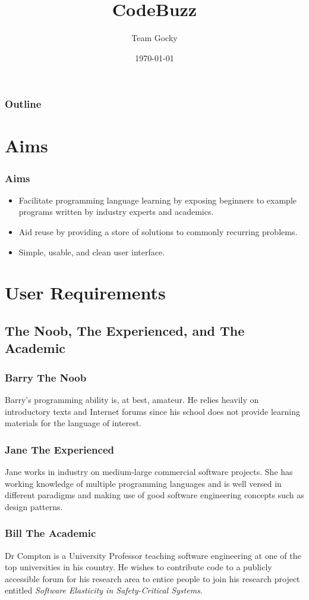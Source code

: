 \documentclass{beamer}
\title[DIM3 Project Presentation]{CodeBuzz}
\author{Team Gocky}
\institute{University Of Glasgow}
\date{\today}
\begin{document}
\begin{frame}
\titlepage
\end{frame}

\begin{frame}
\frametitle{Outline}
\tableofcontents
\end{frame}

\section{Aims}

\begin{frame}
\frametitle{Aims}
\begin{itemize}
\item Facilitate programming language learning by exposing beginners to
example programs written by industry experts and academics.
\item Aid reuse by providing a store of solutions to commonly recurring
problems.
\item Simple, usable, and clean user interface.
\end{itemize}
\end{frame}

\section{User Requirements}

\subsection{The Noob, The Experienced, and The Academic}

\begin{frame}
\frametitle{Barry The Noob}
Barry's programming ability is, at best,
amateur. He relies heavily on introductory texts and Internet forums
since his school does not provide learning materials for the language
of interest.
\end{frame}

\begin{frame}
\frametitle{Jane The Experienced}
Jane works in industry on medium-large commercial software projects. She has 
working knowledge of multiple programming languages and is well versed in 
different paradigms and making use of good software engineering concepts such as 
design patterns.
\end{frame}

\begin{frame}
\frametitle{Bill The Academic}
Dr Compton is a University Professor teaching software engineering at
one of the top universities in his country. He wishes to contribute
code to a publicly accessible forum for his research area to entice
people to join his research project entitled
\textit{Software Elasticity in Safety-Critical Systems}.
\end{frame}
\end{document}
